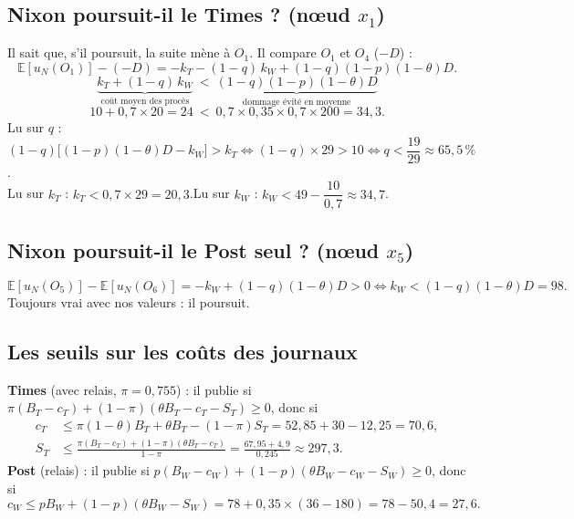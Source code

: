 \documentclass[11pt,a4paper]{article}
\theoremstyle{definition}
\newcommand{\E}{\mathbb{E}}
\begin{document}
\subsection{Nixon poursuit-il le Times ? (nœud $x_1$)}
Il sait que, s'il poursuit, la suite mène à $O_1$. Il compare $O_1$ et $O_4$ ($-D$) :
\[
\E[u_N(O_1)]-(-D)=-k_T-(1-q)\,k_W+(1-q)(1-p)(1-\theta)D .
\]
\begin{equation}
\boxed{\ \underbrace{k_T+(1-q)\,k_W}_{\text{coût moyen des procès}}\ <\ \underbrace{(1-q)(1-p)(1-\theta)D}_{\text{dommage évité en moyenne}}\ }
\end{equation}
\[
10+0,7\times20=24\ <\ 0,7\times0,35\times0,7\times200=34,3 .
\]
Lu sur $q$ : $(1-q)\big[(1-p)(1-\theta)D-k_W\big]>k_T\iff(1-q)\times29>10\iff q<\dfrac{19}{29}\approx65,5\,\%$.\\
Lu sur $k_T$ : $k_T<0,7\times29=20,3$.\quad Lu sur $k_W$ : $k_W<49-\dfrac{10}{0,7}\approx34,7$.

\subsection{Nixon poursuit-il le Post seul ? (nœud $x_5$)}
\[
\E[u_N(O_5)]-\E[u_N(O_6)]=-k_W+(1-q)(1-\theta)D>0\iff k_W<(1-q)(1-\theta)D=98 .
\]
Toujours vrai avec nos valeurs : il poursuit.

\subsection{Les seuils sur les coûts des journaux}
\textbf{Times} (avec relais, $\pi=0,755$) : il publie si $\pi(B_T-c_T)+(1-\pi)(\theta B_T-c_T-S_T)\ge0$, donc si
\begin{align*}
c_T &\le \pi(1-\theta)B_T+\theta B_T-(1-\pi)S_T = 52,85+30-12,25 = 70,6,\\
S_T &\le \frac{\pi(B_T-c_T)+(1-\pi)(\theta B_T-c_T)}{1-\pi} = \frac{67,95+4,9}{0,245}\approx 297,3 .
\end{align*}
\textbf{Post} (relais) : il publie si $p(B_W-c_W)+(1-p)(\theta B_W-c_W-S_W)\ge0$, donc si
\[
c_W \le pB_W+(1-p)(\theta B_W-S_W) = 78+0,35\times(36-180) = 78-50,4 = 27,6 .
\]
\end{document}
